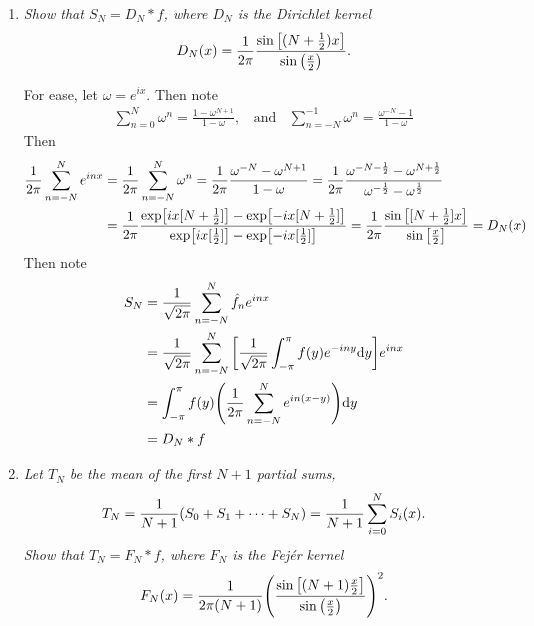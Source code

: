 \documentclass[12pt]{article}
\theoremstyle{plain}
\begin{document}
\begin{enumerate}[\bf (a)]
    \item
        \emph{Show that $S_N = D_N * f$, where $D_N$ is the \emph{Dirichlet kernel} $$D_N(x) = \frac{1}{2\pi}\frac{\sin\qty[(N+\frac{1}{2})x]}{\sin \qty(\frac{x}{2})}.$$}

        For ease, let $\omega = e^{ix}$.  Then note
        \begin{align*}
            \sum_{n=0}^N \omega^n = \frac{1 - \omega^{N+1}}{1 - \omega},\ \ \ \ \text{and}\ \ \ \ \sum_{n=-N}^{-1}\omega^n = \frac{\omega^{-N} - 1}{1 - \omega}
        \end{align*}
        Then
        \begin{align*}
            \frac{1}{2\pi}\sum_{n=-N}^N e^{inx} &= \frac{1}{2\pi}\sum_{n=-N}^N \omega^n = \frac{1}{2\pi}\frac{\omega^{-N} - \omega^{N+1}}{1 - \omega} = \frac{1}{2\pi}\frac{\omega^{-N - \frac{1}{2}} - \omega^{N + \frac{1}{2}}}{\omega^{-\frac{1}{2}} - \omega^{\frac{1}{2}}} \\
            &= \frac{1}{2\pi}\frac{\exp[ix[N + \frac{1}{2}]] - \exp[-ix[N+\frac{1}{2}]]}{\exp[ix[\frac{1}{2}]] - \exp[-ix[\frac{1}{2}]]} = \frac{1}{2\pi}\frac{\sin\qty[[N+\frac{1}{2}]x]}{\sin\qty[\frac{x}{2}]} = D_N(x)
        \end{align*}
        Then note
        \begin{align*}
            S_N &= \frac{1}{\sqrt{2\pi}}\sum_{n=-N}^N\hat{f}_n e^{inx} \\
            &= \frac{1}{\sqrt{2\pi}}\sum_{n=-N}^N\qty[\frac{1}{\sqrt{2\pi}}\int_{-\pi}^\pi f(y)e^{-iny}\dd y]e^{inx} \\
            &= \int_{-\pi}^\pi f(y)\qty(\frac{1}{2\pi}\sum_{n=-N}^N e^{in(x-y)})\dd y \\
            &= D_N * f
        \end{align*}
    \item
        \emph{Let $T_N$ be the mean of the first $N+1$ partial sums, $$T_N = \frac{1}{N+1}\qty(S_0 + S_1 + \dots + S_N) = \frac{1}{N+1}\sum_{i=0}^N S_i(x).$$  Show that $T_N = F_N * f$, where $F_N$ is the \emph{Fej\'{e}r kernel} $$F_N(x) = \frac{1}{2\pi(N + 1)}\qty(\frac{\sin\qty[(N + 1)\frac{x}{2}]}{\sin\qty(\frac{x}{2})})^2.$$}


\end{enumerate}
\end{document}
